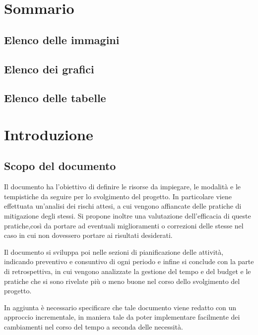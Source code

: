 \documentclass[10pt, a4paper]{article}
\title{\titolo}
\author{SWEetCode}
\begin{document}



\newpage

\tableofcontents
\section*{Sommario}
\subsection*{Elenco delle immagini}
\subsection*{Elenco dei grafici}
\subsection*{Elenco delle tabelle}
\newpage


\section{Introduzione}



\subsection{Scopo del documento}
Il documento ha l'obiettivo di definire le risorse da impiegare, le modalità e le tempistiche da seguire per lo svolgimento del progetto. In particolare viene effettuata un'analisi dei rischi attesi, a cui vengono affiancate delle pratiche di mitigazione degli stessi. Si propone inoltre una valutazione dell'efficacia di queste pratiche,così da portare ad eventuali miglioramenti o correzioni delle stesse nel caso in cui non dovessero portare ai risultati desiderati.

Il documento si sviluppa poi nelle sezioni di pianificazione delle attività, indicando preventivo e consuntivo di ogni periodo e infine si conclude con la parte di retrospettiva, in cui vengono analizzate la gestione del tempo e del budget e le pratiche che si sono rivelate più o meno buone nel corso dello svolgimento del progetto.

In aggiunta è necessario specificare che tale documento viene redatto con un approccio incrementale, in maniera tale da poter implementare facilmente dei cambiamenti nel corso del tempo a seconda delle necessità.
\end{document}
